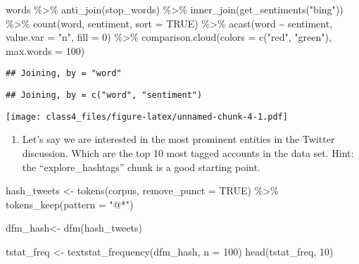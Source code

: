 \documentclass[
]{article}
\newenvironment{Shaded}{\begin{snugshade}}{\end{snugshade}}
\newcommand{\AttributeTok}[1]{\textcolor[rgb]{0.77,0.63,0.00}{#1}}
\newcommand{\ConstantTok}[1]{\textcolor[rgb]{0.00,0.00,0.00}{#1}}
\newcommand{\DecValTok}[1]{\textcolor[rgb]{0.00,0.00,0.81}{#1}}
\newcommand{\FunctionTok}[1]{\textcolor[rgb]{0.00,0.00,0.00}{#1}}
\newcommand{\NormalTok}[1]{#1}
\newcommand{\OtherTok}[1]{\textcolor[rgb]{0.56,0.35,0.01}{#1}}
\newcommand{\SpecialCharTok}[1]{\textcolor[rgb]{0.00,0.00,0.00}{#1}}
\newcommand{\StringTok}[1]{\textcolor[rgb]{0.31,0.60,0.02}{#1}}
\providecommand{\tightlist}{%
  \setlength{\itemsep}{0pt}\setlength{\parskip}{0pt}}
\begin{document}
\begin{Shaded}
\begin{Highlighting}[]
\NormalTok{words }\SpecialCharTok{\%\textgreater{}\%}
  \FunctionTok{anti\_join}\NormalTok{(stop\_words) }\SpecialCharTok{\%\textgreater{}\%} 
  \FunctionTok{inner\_join}\NormalTok{(}\FunctionTok{get\_sentiments}\NormalTok{(}\StringTok{"bing"}\NormalTok{)) }\SpecialCharTok{\%\textgreater{}\%} 
  \FunctionTok{count}\NormalTok{(word, sentiment, }\AttributeTok{sort =} \ConstantTok{TRUE}\NormalTok{) }\SpecialCharTok{\%\textgreater{}\%}
  \FunctionTok{acast}\NormalTok{(word }\SpecialCharTok{\textasciitilde{}}\NormalTok{ sentiment, }\AttributeTok{value.var =} \StringTok{"n"}\NormalTok{, }\AttributeTok{fill =} \DecValTok{0}\NormalTok{) }\SpecialCharTok{\%\textgreater{}\%}
  \FunctionTok{comparison.cloud}\NormalTok{(}\AttributeTok{colors =} \FunctionTok{c}\NormalTok{(}\StringTok{"red"}\NormalTok{, }\StringTok{"green"}\NormalTok{),}
                   \AttributeTok{max.words =} \DecValTok{100}\NormalTok{)}
\end{Highlighting}
\end{Shaded}

\begin{verbatim}
## Joining, by = "word"
\end{verbatim}

\begin{verbatim}
## Joining, by = c("word", "sentiment")
\end{verbatim}

\texttt{[image: class4\_files/figure-latex/unnamed-chunk-4-1.pdf]}

\begin{enumerate}
\def\labelenumi{\arabic{enumi}.}
\setcounter{enumi}{3}
\tightlist
\item
  Let's say we are interested in the most prominent entities in the
  Twitter discussion. Which are the top 10 most tagged accounts in the
  data set. Hint: the ``explore\_hashtags'' chunk is a good starting
  point.
\end{enumerate}

\begin{Shaded}
\begin{Highlighting}[]
\NormalTok{hash\_tweets }\OtherTok{\textless{}{-}} \FunctionTok{tokens}\NormalTok{(corpus, }\AttributeTok{remove\_punct =} \ConstantTok{TRUE}\NormalTok{) }\SpecialCharTok{\%\textgreater{}\%} 
               \FunctionTok{tokens\_keep}\NormalTok{(}\AttributeTok{pattern =} \StringTok{"@*"}\NormalTok{)}

\NormalTok{dfm\_hash}\OtherTok{\textless{}{-}} \FunctionTok{dfm}\NormalTok{(hash\_tweets)}

\NormalTok{tstat\_freq }\OtherTok{\textless{}{-}} \FunctionTok{textstat\_frequency}\NormalTok{(dfm\_hash, }\AttributeTok{n =} \DecValTok{100}\NormalTok{)}
\FunctionTok{head}\NormalTok{(tstat\_freq, }\DecValTok{10}\NormalTok{)}
\end{Highlighting}
\end{Shaded}
\end{document}
